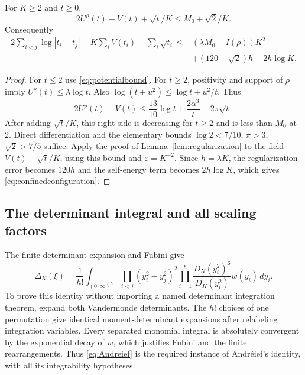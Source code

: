 \begin{lemma}
\label{lem:confinement}
For $K\ge2$ and $t\ge0$,
\[
 2U^\rho(t)-V(t)+\sqrt t/K\le M_0+\sqrt2/K.
\]
Consequently
\begin{equation}\label{eq:confinedconfiguration}
\begin{split}
 2\sum_{i<j}\log|t_i-t_j|-K\sum_iV(t_i)+\sum_i\sqrt{t_i}
 \le{}&(\lambda M_0-I(\rho))K^2\\
 &+(120+\sqrt2)h+2h\log K.
\end{split}
\end{equation}
\end{lemma}
\begin{proof}
For $t\le2$ use \eqref{eq:potentialbound}. For $t\ge2$, positivity and
support of $\rho$ imply $U^\rho(t)\le\lambda\log t$. Also
$\log(t+u^2)\le\log t+u^2/t$. Thus
\begin{equation}\label{eq:fieldtail}
 2U^\rho(t)-V(t)
 \le\frac{13}{10}\log t+\frac{2\alpha^3}{t}-2\pi\sqrt t.
\end{equation}
After adding $\sqrt t/K$, this right side is decreasing for $t\ge2$
and is less than $M_0$ at $2$. Direct differentiation and the elementary
bounds $\log2<7/10$, $\pi>3$, $\sqrt2>7/5$ suffice. Apply the proof of
Lemma~\ref{lem:regularization} to the field $V(t)-\sqrt t/K$, using
this bound and $\varepsilon=K^{-2}$. Since $h=\lambda K$, the
regularization error becomes $120h$ and the self-energy term becomes
$2h\log K$, which gives \eqref{eq:confinedconfiguration}.
\end{proof}

\subsection{The determinant integral and all scaling factors}
The finite determinant expansion and Fubini give
\begin{equation}\label{eq:Andreief}
 \Delta_K(\xi)=\frac1{h!}\int_{(0,\infty)^h}
 \prod_{i<j}(y_i^2-y_j^2)^2
 \prod_{i=1}^h\frac{D_N(y_i^2)^6}{D_K(y_i^2)}w(y_i)\,dy_i.
\end{equation}
To prove this identity without importing a named determinant integration
theorem, expand both Vandermonde determinants. The $h!$ choices of one
permutation give identical moment-determinant expansions after relabeling
integration variables. Every separated monomial integral is absolutely
convergent by the exponential decay of $w$, which justifies Fubini and
the finite rearrangements. Thus \eqref{eq:Andreief} is the required
instance of Andr\'eief's identity, with all its integrability hypotheses.

